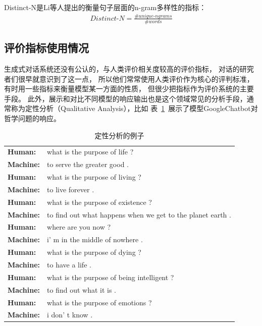 Distinct-N是Li等人提出的衡量句子层面的n-gram多样性的指标：
\begin{align}
    \textit{Distinct-N} = \frac{\#\textit{unique-ngrams}}{\#\textit{words}}
\end{align}

\subsection{评价指标使用情况}\label{subsec:metrics_usage}
生成式对话系统还没有公认的，与人类评价相关度较高的评价指标，
对话的研究者们很早就意识到了这一点，
所以他们常常使用人类评价作为核心的评判标准，有时用一些指标来衡量模型某一方面的性质，
但很少把指标作为评价系统的主要手段。
此外，展示和对比不同模型的响应输出也是这个领域常见的分析手段，通常称为定性分析（Qualitative Analysis），比如
表~\ref{tab:qualitative_analysis}~展示了模型GoogleChatbot对哲学问题的响应。
\begin{table}[H]
    \centering
    \caption{定性分析的例子}
    \label{tab:qualitative_analysis}
    \begin{tabular}{ll}
        \textbf{Human:} & what is the purpose of life ? \\
        \textbf{Machine:} & to serve the greater good .\\
        \textbf{Human:} & what is the purpose of living ? \\
        \textbf{Machine:} & to live forever . \\
        \textbf{Human:} & what is the purpose of existence ? \\
        \textbf{Machine:} & to find out what happens when we get
        to the planet earth . \\
        \textbf{Human:} & where are you now ? \\
        \textbf{Machine:} & i' m in the middle of nowhere . \\
        \textbf{Human:} & what is the purpose of dying ? \\
        \textbf{Machine:} & to have a life . \\
        \textbf{Human:} & what is the purpose of being intelligent ? \\
        \textbf{Machine:} & to find out what it is . \\
        \textbf{Human:} & what is the purpose of emotions ? \\
        \textbf{Machine:} & i don' t know .
    \end{tabular}
\end{table}

